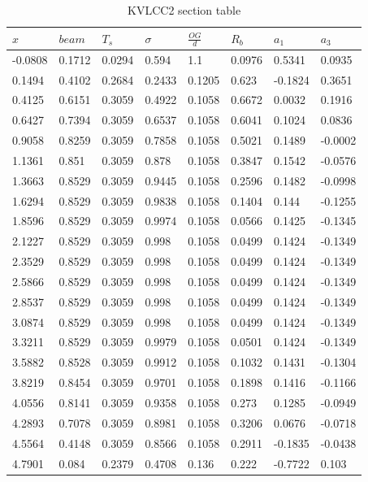     
\begin{table}[H]
\small
\center
\caption{KVLCC2 section table}
\label{tab:kvlcc2_section_table}
\begin{tabular}{llllllll}
\toprule\addlinespace$x$ & $beam$ & $T_s$ & $\sigma$ & $\frac{OG}{d}$ & $R_b$ & $a_1$ & $a_3$\\ 
\midrule-0.0808 & 0.1712 & 0.0294 & 0.594 & 1.1 & 0.0976 & 0.5341 & 0.0935\\ 
0.1494 & 0.4102 & 0.2684 & 0.2433 & 0.1205 & 0.623 & -0.1824 & 0.3651\\ 
0.4125 & 0.6151 & 0.3059 & 0.4922 & 0.1058 & 0.6672 & 0.0032 & 0.1916\\ 
0.6427 & 0.7394 & 0.3059 & 0.6537 & 0.1058 & 0.6041 & 0.1024 & 0.0836\\ 
0.9058 & 0.8259 & 0.3059 & 0.7858 & 0.1058 & 0.5021 & 0.1489 & -0.0002\\ 
1.1361 & 0.851 & 0.3059 & 0.878 & 0.1058 & 0.3847 & 0.1542 & -0.0576\\ 
1.3663 & 0.8529 & 0.3059 & 0.9445 & 0.1058 & 0.2596 & 0.1482 & -0.0998\\ 
1.6294 & 0.8529 & 0.3059 & 0.9838 & 0.1058 & 0.1404 & 0.144 & -0.1255\\ 
1.8596 & 0.8529 & 0.3059 & 0.9974 & 0.1058 & 0.0566 & 0.1425 & -0.1345\\ 
2.1227 & 0.8529 & 0.3059 & 0.998 & 0.1058 & 0.0499 & 0.1424 & -0.1349\\ 
2.3529 & 0.8529 & 0.3059 & 0.998 & 0.1058 & 0.0499 & 0.1424 & -0.1349\\ 
2.5866 & 0.8529 & 0.3059 & 0.998 & 0.1058 & 0.0499 & 0.1424 & -0.1349\\ 
2.8537 & 0.8529 & 0.3059 & 0.998 & 0.1058 & 0.0499 & 0.1424 & -0.1349\\ 
3.0874 & 0.8529 & 0.3059 & 0.998 & 0.1058 & 0.0499 & 0.1424 & -0.1349\\ 
3.3211 & 0.8529 & 0.3059 & 0.9979 & 0.1058 & 0.0501 & 0.1424 & -0.1349\\ 
3.5882 & 0.8528 & 0.3059 & 0.9912 & 0.1058 & 0.1032 & 0.1431 & -0.1304\\ 
3.8219 & 0.8454 & 0.3059 & 0.9701 & 0.1058 & 0.1898 & 0.1416 & -0.1166\\ 
4.0556 & 0.8141 & 0.3059 & 0.9358 & 0.1058 & 0.273 & 0.1285 & -0.0949\\ 
4.2893 & 0.7078 & 0.3059 & 0.8981 & 0.1058 & 0.3206 & 0.0676 & -0.0718\\ 
4.5564 & 0.4148 & 0.3059 & 0.8566 & 0.1058 & 0.2911 & -0.1835 & -0.0438\\ 
4.7901 & 0.084 & 0.2379 & 0.4708 & 0.136 & 0.222 & -0.7722 & 0.103\\ 

\bottomrule
\end{tabular}
\end{table}

